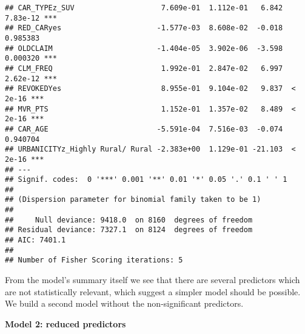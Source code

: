 \documentclass[]{article}
\begin{document}
\begin{verbatim}
## CAR_TYPEz_SUV                    7.609e-01  1.112e-01   6.842 7.83e-12 ***
## RED_CARyes                      -1.577e-03  8.608e-02  -0.018 0.985383    
## OLDCLAIM                        -1.404e-05  3.902e-06  -3.598 0.000320 ***
## CLM_FREQ                         1.992e-01  2.847e-02   6.997 2.62e-12 ***
## REVOKEDYes                       8.955e-01  9.104e-02   9.837  < 2e-16 ***
## MVR_PTS                          1.152e-01  1.357e-02   8.489  < 2e-16 ***
## CAR_AGE                         -5.591e-04  7.516e-03  -0.074 0.940704    
## URBANICITYz_Highly Rural/ Rural -2.383e+00  1.129e-01 -21.103  < 2e-16 ***
## ---
## Signif. codes:  0 '***' 0.001 '**' 0.01 '*' 0.05 '.' 0.1 ' ' 1
## 
## (Dispersion parameter for binomial family taken to be 1)
## 
##     Null deviance: 9418.0  on 8160  degrees of freedom
## Residual deviance: 7327.1  on 8124  degrees of freedom
## AIC: 7401.1
## 
## Number of Fisher Scoring iterations: 5
\end{verbatim}

From the model's summary itself we see that there are several predictors
which are not statistically relevant, which suggest a simpler model
should be possible. We build a second model without the non-significant
predictors.

\textbf{Model 2: reduced predictors}
\end{document}
